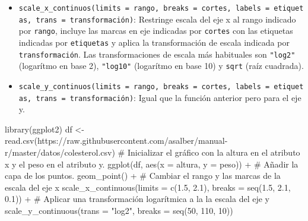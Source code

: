 \documentclass[
  a4paper,
]{scrreport}
\newenvironment{Shaded}{\begin{snugshade}}{\end{snugshade}}
\newcommand{\AttributeTok}[1]{\textcolor[rgb]{0.40,0.45,0.13}{#1}}
\newcommand{\CommentTok}[1]{\textcolor[rgb]{0.37,0.37,0.37}{#1}}
\newcommand{\DecValTok}[1]{\textcolor[rgb]{0.68,0.00,0.00}{#1}}
\newcommand{\FloatTok}[1]{\textcolor[rgb]{0.68,0.00,0.00}{#1}}
\newcommand{\FunctionTok}[1]{\textcolor[rgb]{0.28,0.35,0.67}{#1}}
\newcommand{\NormalTok}[1]{\textcolor[rgb]{0.00,0.23,0.31}{#1}}
\newcommand{\OtherTok}[1]{\textcolor[rgb]{0.00,0.23,0.31}{#1}}
\newcommand{\SpecialCharTok}[1]{\textcolor[rgb]{0.37,0.37,0.37}{#1}}
\newcommand{\StringTok}[1]{\textcolor[rgb]{0.13,0.47,0.30}{#1}}
\theoremstyle{definition}
\theoremstyle{definition}
\theoremstyle{remark}
\begin{document}
\begin{itemize}
\item
  \texttt{scale\_x\_continuos(limits\ =\ rango,\ breaks\ =\ cortes,\ labels\ =\ etiquetas,\ trans\ =\ transformación)}:
  Restringe escala del eje x al rango indicado por \texttt{rango},
  incluye las marcas en eje indicadas por \texttt{cortes} con las
  etiquetas indicadas por \texttt{etiquetas} y aplica la transformación
  de escala indicada por \texttt{transformación}. Las transformaciones
  de escala más habituales son \texttt{"log2"} (logarítmo en base 2),
  \texttt{"log10"} (logarítmo en base 10) y \texttt{sqrt} (raíz
  cuadrada).
\item
  \texttt{scale\_y\_continuos(limits\ =\ rango,\ breaks\ =\ cortes,\ labels\ =\ etiquetas,\ trans\ =\ transformación)}:
  Igual que la función anterior pero para el eje y.
\end{itemize}

\begin{Shaded}
\begin{Highlighting}[]
\FunctionTok{library}\NormalTok{(ggplot2)}
\NormalTok{df }\OtherTok{\textless{}{-}} \FunctionTok{read.csv}\NormalTok{(}\StringTok{\textquotesingle{}https://raw.githubusercontent.com/asalber/manual{-}r/master/datos/colesterol.csv\textquotesingle{}}\NormalTok{)}
\CommentTok{\# Inicializar el gráfico con la altura en el atributo x y el peso en el atributo y.}
\FunctionTok{ggplot}\NormalTok{(df, }\FunctionTok{aes}\NormalTok{(}\AttributeTok{x =}\NormalTok{ altura, }\AttributeTok{y =}\NormalTok{ peso)) }\SpecialCharTok{+}
\CommentTok{\# Añadir la capa de los puntos.}
    \FunctionTok{geom\_point}\NormalTok{() }\SpecialCharTok{+}
\CommentTok{\# Cambiar el rango y las marcas de la escala del eje x}
    \FunctionTok{scale\_x\_continuous}\NormalTok{(}\AttributeTok{limits =} \FunctionTok{c}\NormalTok{(}\FloatTok{1.5}\NormalTok{, }\FloatTok{2.1}\NormalTok{), }\AttributeTok{breaks =} \FunctionTok{seq}\NormalTok{(}\FloatTok{1.5}\NormalTok{, }\FloatTok{2.1}\NormalTok{, }\FloatTok{0.1}\NormalTok{)) }\SpecialCharTok{+}
\CommentTok{\# Aplicar una transformación logarítmica a la la escala del eje y}
    \FunctionTok{scale\_y\_continuous}\NormalTok{(}\AttributeTok{trans =} \StringTok{"log2"}\NormalTok{, }\AttributeTok{breaks =} \FunctionTok{seq}\NormalTok{(}\DecValTok{50}\NormalTok{, }\DecValTok{110}\NormalTok{, }\DecValTok{10}\NormalTok{))}
\end{Highlighting}
\end{Shaded}
\end{document}

